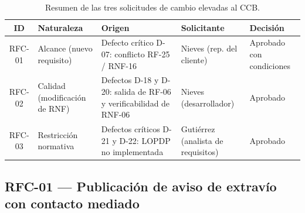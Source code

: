 \documentclass[journal,onecolumn]{IEEEtran}
\begin{document}
	\begin{table}[h!]
		\centering
		\caption{Resumen de las tres solicitudes de cambio elevadas al CCB.}
		\label{tab:resumen-rfc}
		\begin{tabular}{
				|c
				|>{\raggedright\arraybackslash}p{3.3cm}
				|>{\raggedright\arraybackslash}p{3.8cm}
				|>{\raggedright\arraybackslash}p{2.7cm}
				|>{\raggedright\arraybackslash}p{2.5cm}|
			}
			\hline
			\textbf{ID} & \textbf{Naturaleza} & \textbf{Origen} & \textbf{Solicitante} & \textbf{Decisión} \\
			\hline
			RFC-01 & Alcance (nuevo requisito) & Defecto crítico D-07:
			conflicto RF-25 / RNF-16 & Nieves (rep. del cliente) & Aprobado
			con condiciones \\
			\hline
			RFC-02 & Calidad (modificación de RNF) & Defectos D-18 y D-20:
			salida de RF-06 y verificabilidad de RNF-06 & Nieves
			(desarrollador) & Aprobado \\
			\hline
			RFC-03 & Restricción normativa & Defectos críticos D-21 y D-22:
			LOPDP no implementada & Gutiérrez (analista de requisitos) &
			Aprobado \\
			\hline
		\end{tabular}
	\end{table}
	
	\subsection{RFC-01 — Publicación de aviso de extravío con contacto mediado}
	
\end{document}
